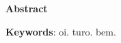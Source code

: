 \begin{center}
\textbf{\Large Abstract}
\end{center}

\lipsum[1]

\begin{flushleft}
\textbf{Keywords}: oi. turo. bem.
\end{flushleft}

\pagebreak

